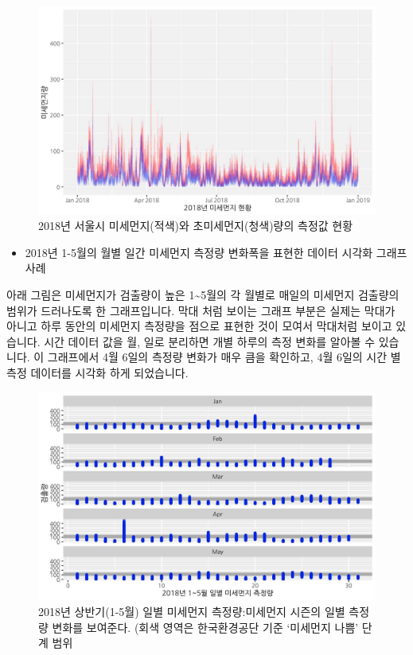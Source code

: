 \documentclass[
  letterpaper,
]{book}
\providecommand{\tightlist}{%
  \setlength{\itemsep}{0pt}\setlength{\parskip}{0pt}}\usepackage{longtable,booktabs,array}
\begin{document}
\begin{figure}[H]

{\centering \includegraphics{img/fig4.png}

}

\caption{2018년 서울시 미세먼지(적색)와 초미세먼지(청색)량의 측정값
현황}

\end{figure}%

\begin{itemize}
\tightlist
\item
  2018년 1-5월의 월별 일간 미세먼지 측정량 변화폭을 표현한 데이터 시각화
  그래프 사례
\end{itemize}

아래 그림은 미세먼지가 검출량이 높은 1\textasciitilde5월의 각 월별로
매일의 미세먼지 검출량의 범위가 드러나도록 한 그래프입니다. 막대 처럼
보이는 그래프 부분은 실제는 막대가 아니고 하루 동안의 미세먼지 측정량을
점으로 표현한 것이 모여서 막대처럼 보이고 있습니다. 시간 데이터 값을 월,
일로 분리하면 개별 하루의 측정 변화를 알아볼 수 있습니다. 이 그래프에서
4월 6일의 측정량 변화가 매우 큼을 확인하고, 4월 6일의 시간 별 측정
데이터를 시각화 하게 되었습니다.

\begin{figure}[H]

{\centering \includegraphics{img/fig5.png}

}

\caption{2018년 상반기(1-5월) 일별 미세먼지 측정량:미세먼지 시즌의 일별
측정량 변화를 보여준다. (회색 영역은 한국환경공단 기준 `미세먼지 나쁨'
단계 범위}

\end{figure}%
\end{document}
